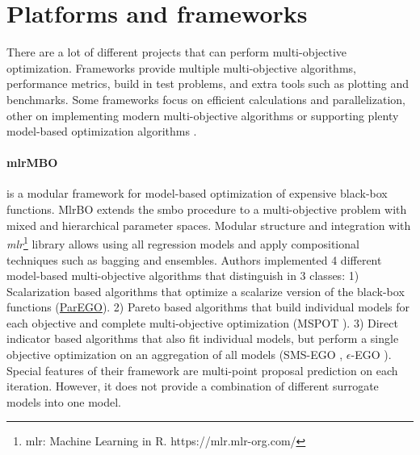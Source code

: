     \section{Platforms and frameworks}
        There are a lot of different projects that can perform multi-objective optimization. Frameworks provide multiple multi-objective algorithms, performance metrics, build in test problems, and extra tools such as plotting and benchmarks. Some frameworks focus on efficient calculations and parallelization\cite{francesco_biscani_2019}, other on implementing modern multi-objective algorithms \cite{benitezhidalgo2019jmetalpy, TianPlatEMO} or supporting plenty model-based optimization algorithms \cite{BischlmlrMBO}.

        \paragraph{mlrMBO}\cite{BischlmlrMBO} is a modular framework for model-based optimization of expensive black-box functions. MlrBO extends the \gls{smbo} procedure to a multi-objective problem with mixed and hierarchical parameter spaces. Modular structure and integration with \emph{mlr}\footnote{{mlr}: Machine Learning in R. https://mlr.mlr-org.com/} library allows using all regression models and apply compositional techniques such as bagging and ensembles. Authors implemented 4 different model-based multi-objective algorithms that distinguish in 3 classes: 1) Scalarization based algorithms that optimize a scalarize version of the black-box functions (\hyperref[alg:ParEGO]{ParEGO}). 2) Pareto based algorithms that build individual models for each objective and complete multi-objective optimization (MSPOT \cite{ZaeffererBNWE13}). 3) Direct indicator based algorithms that also fit individual models, but perform a single objective optimization on an aggregation of all models (SMS-EGO \cite{inproceedings}, $\epsilon$-EGO \cite{WagEGOe}).
        Special features of their framework are multi-point proposal prediction on each iteration. However, it does not provide a combination of different surrogate models into one model.
       

